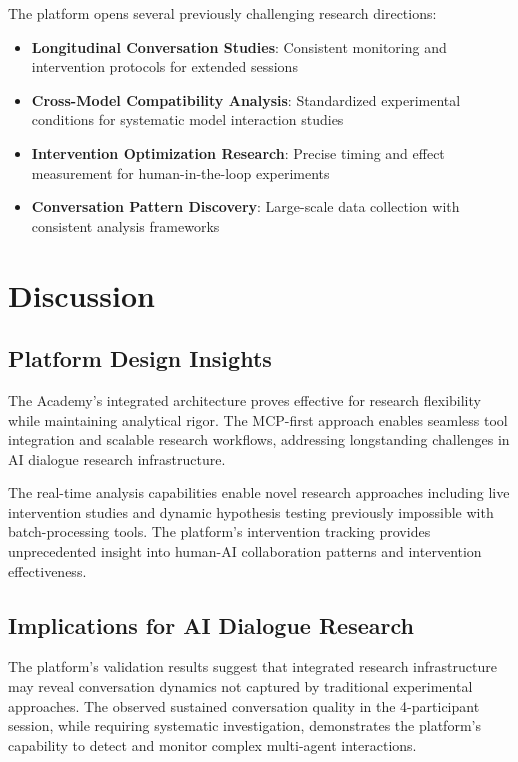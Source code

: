 \documentclass[11pt,letterpaper]{article}
\newcommand{\theacademy}{The Academy}
\newcommand{\mcp}{MCP}
\begin{document}
The platform opens several previously challenging research directions:

\begin{itemize}
    \item \textbf{Longitudinal Conversation Studies}: Consistent monitoring and intervention protocols for extended sessions
    \item \textbf{Cross-Model Compatibility Analysis}: Standardized experimental conditions for systematic model interaction studies
    \item \textbf{Intervention Optimization Research}: Precise timing and effect measurement for human-in-the-loop experiments
    \item \textbf{Conversation Pattern Discovery}: Large-scale data collection with consistent analysis frameworks
\end{itemize}

\section{Discussion}

\subsection{Platform Design Insights}

\theacademy{}'s integrated architecture proves effective for research flexibility while maintaining analytical rigor. The \mcp{}-first approach enables seamless tool integration and scalable research workflows, addressing longstanding challenges in AI dialogue research infrastructure.

The real-time analysis capabilities enable novel research approaches including live intervention studies and dynamic hypothesis testing previously impossible with batch-processing tools. The platform's intervention tracking provides unprecedented insight into human-AI collaboration patterns and intervention effectiveness.

\subsection{Implications for AI Dialogue Research}

The platform's validation results suggest that integrated research infrastructure may reveal conversation dynamics not captured by traditional experimental approaches. The observed sustained conversation quality in the 4-participant session, while requiring systematic investigation, demonstrates the platform's capability to detect and monitor complex multi-agent interactions.
\end{document}
